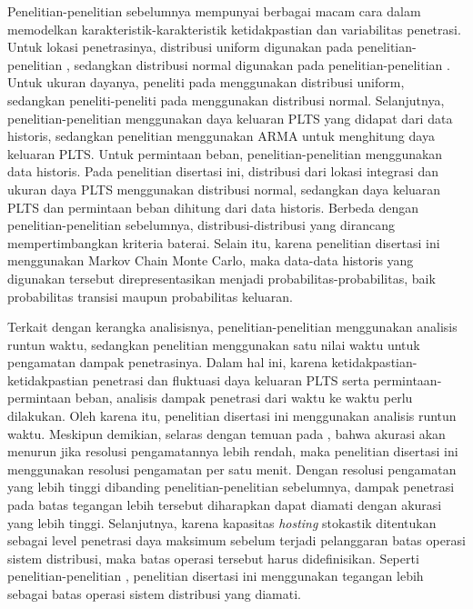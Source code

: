 {{{{{{Penelitian-penelitian sebelumnya mempunyai berbagai macam cara dalam memodelkan karakteristik-karakteristik ketidakpastian dan variabilitas penetrasi. Untuk lokasi penetrasinya, distribusi uniform digunakan pada penelitian-penelitian \cite{Kharrazi2020,Shahnia2011}, sedangkan distribusi normal digunakan pada penelitian-penelitian \cite{Dubey2017,Ding2017,Torquato2018,Epri2012,Dubey2015}. Untuk ukuran dayanya, peneliti pada \cite{Shahnia2011} menggunakan distribusi uniform, sedangkan peneliti-peneliti pada \cite{Kharrazi2020,Dubey2017,Ding2017,Epri2012,Dubey2015} menggunakan distribusi normal. Selanjutnya, penelitian-penelitian \cite{Ruiz-Rodriguez2012,Dubey2017,Ding2017} menggunakan daya keluaran PLTS yang didapat dari data historis, sedangkan penelitian \cite{Silva2016} menggunakan ARMA untuk menghitung daya keluaran PLTS. Untuk permintaan beban, penelitian-penelitian \cite{Dubey2017,Ding2017,Torquato2018} menggunakan data historis. Pada penelitian disertasi ini, distribusi dari lokasi integrasi dan ukuran daya PLTS menggunakan distribusi normal, sedangkan daya keluaran PLTS dan permintaan beban dihitung dari data historis. Berbeda dengan penelitian-penelitian sebelumnya, distribusi-distribusi yang dirancang mempertimbangkan kriteria baterai. Selain itu, karena penelitian disertasi ini menggunakan Markov Chain Monte Carlo, maka data-data historis yang digunakan tersebut direpresentasikan menjadi probabilitas-probabilitas, baik probabilitas transisi maupun probabilitas keluaran.

Terkait dengan kerangka analisisnya, penelitian-penelitian \cite{Epri2012,Dubey2015,Dubey2017,Ding2017,Bollen2017,Torquato2018,Vergara2020} menggunakan analisis runtun waktu, sedangkan penelitian \cite{Deakin2019} menggunakan satu nilai waktu untuk pengamatan dampak penetrasinya. Dalam hal ini, karena ketidakpastian-ketidakpastian penetrasi dan fluktuasi daya keluaran PLTS serta permintaan-permintaan beban, analisis dampak penetrasi dari waktu ke waktu perlu dilakukan. Oleh karena itu, penelitian disertasi ini menggunakan analisis runtun waktu. Meskipun demikian, selaras dengan temuan pada \cite{Beck2016}, bahwa akurasi akan menurun jika resolusi pengamatannya lebih rendah, maka penelitian disertasi ini menggunakan resolusi pengamatan per satu menit. Dengan resolusi pengamatan yang lebih tinggi dibanding penelitian-penelitian sebelumnya, dampak penetrasi pada batas tegangan lebih tersebut diharapkan dapat diamati dengan akurasi yang lebih tinggi. Selanjutnya, karena kapasitas \textit{hosting} stokastik ditentukan sebagai level penetrasi daya maksimum sebelum terjadi pelanggaran batas operasi sistem distribusi, maka batas operasi tersebut harus didefinisikan. Seperti penelitian-penelitian \cite{Santos-Martin2016,Silva2016,Navarro-Espinosa2016,Arshad2017,Baptista2019,Epri2012,Dubey2015,Dubey2017,Ding2017,Bollen2017,Torquato2018,Deakin2019,Vergara2020}, penelitian disertasi ini menggunakan tegangan lebih sebagai batas operasi sistem distribusi yang diamati.

}}}}}}
